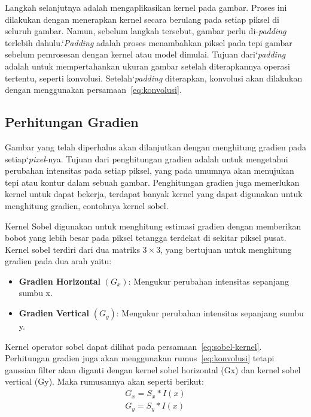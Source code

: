     Langkah selanjutnya adalah mengaplikasikan kernel pada gambar. Proses ini dilakukan dengan menerapkan kernel secara berulang pada setiap piksel di seluruh gambar.
Namun, sebelum langkah tersebut, gambar perlu di-\emph{padding} terlebih dahulu.`\emph{Padding} adalah proses menambahkan piksel pada tepi gambar sebelum pemrosesan dengan kernel atau model dimulai.
Tujuan dari`\emph{padding} adalah untuk mempertahankan ukuran gambar setelah diterapkannya operasi tertentu, seperti konvolusi. 
Setelah`\emph{padding} diterapkan, konvolusi akan dilakukan dengan menggunakan persamaan~\eqref{eq:konvolusi}. 

\subsection{Perhitungan Gradien}
    Gambar yang telah diperhalus akan dilanjutkan dengan menghitung gradien pada setiap`\emph{pixel}-nya. Tujuan dari penghitungan gradien adalah untuk mengetahui perubahan intensitas pada setiap piksel, yang pada umumnya akan menujukan tepi atau kontur dalam sebuah gambar.
Penghitungan gradien juga memerlukan kernel untuk dapat bekerja, terdapat banyak kernel yang dapat digunakan untuk menghitung gradien, contohnya kernel sobel. 

    Kernel Sobel digunakan untuk menghitung estimasi gradien dengan memberikan bobot yang lebih besar pada piksel tetangga terdekat di sekitar piksel pusat.
Kernel sobel terdiri dari dua matriks \(3 \times 3\), yang bertujuan untuk menghitung gradien pada dua arah yaitu:
 \begin{itemize}
    \item \textbf{Gradien Horizontal} \((G_{x})\): Mengukur perubahan intensitas sepanjang sumbu x.
    \item \textbf{Gradien Vertical} \((G_{y})\): Mengukur perubahan intensitas sepanjang sumbu y.
\end{itemize}Kernel operator sobel dapat dilihat pada persamaan~\eqref{eq:sobel-kernel}. 
Perhitungan gradien juga akan menggunakan rumus~\eqref{eq:konvolusi} tetapi gaussian filter akan diganti dengan kernel sobel horizontal (Gx) dan kernel sobel vertical (Gy).
Maka rumusannya akan seperti berikut:
\begin{equation}
    \begin{aligned}
        G_{x} = S_{x} * I(x)\\ G_{y} = S_{y} * I(x)
    \end{aligned}
\end{equation}


